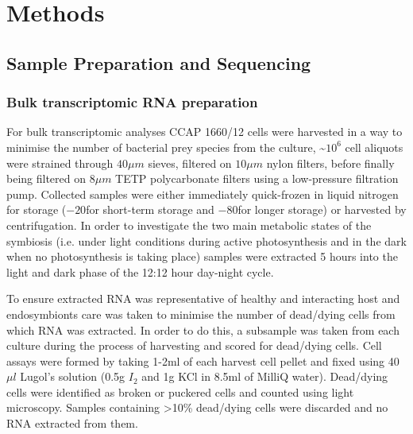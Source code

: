\section{Methods} 

\subsection{Sample Preparation and Sequencing}

\subsubsection{Bulk transcriptomic RNA preparation}
For bulk transcriptomic analyses CCAP 1660/12 cells were harvested in a way to minimise the 
number of bacterial prey species from the culture, \textasciitilde \(10^{6}\) 
cell aliquots were strained through \(40\mu m\) sieves, filtered on 
\(10 \mu m\) nylon filters, 
before finally being filtered on \(8 \mu m\) TETP polycarbonate filters using a 
low-pressure filtration pump.  Collected samples were either immediately 
quick-frozen in liquid nitrogen for storage (\(-20\)\celsius for short-term storage 
and \(-80\)\celsius for longer storage) or harvested by centrifugation.  
In order to investigate the two main metabolic states of the symbiosis 
(i.e. under light conditions during active photosynthesis and in the dark 
when no photosynthesis is taking place) samples were extracted 5 hours into 
the light and dark phase of the 12:12 hour day-night cycle.

To ensure extracted RNA was representative of healthy and interacting host 
and endosymbionts care was taken to minimise the number of dead/dying cells 
from which RNA was extracted.  In order to do this, a subsample was taken 
from each culture during the process of harvesting and scored for dead/dying cells.  
Cell assays were formed by taking 1-2ml of each harvest cell pellet and 
fixed using 40\(\mu l\) Lugol's solution (0.5g \(I_{2}\) and 1g KCl in 8.5ml 
of MilliQ water). Dead/dying cells were identified as broken or puckered cells 
and counted using light microscopy.  Samples containing >10\% dead/dying cells 
were discarded and no RNA extracted from them.

